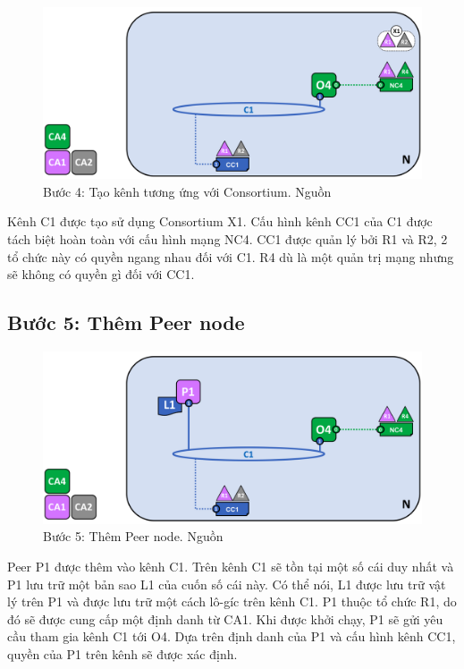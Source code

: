 \documentclass[../DoAn.tex]{subfiles}
\begin{document}
\begin{figure}[h]
  \centering
  \includegraphics[width=0.7\linewidth]{Hinhve/network.diagram.4.png}
  \caption[Bước 4: Tạo kênh tương ứng với Consortium]{Bước 4: Tạo kênh tương ứng với Consortium. Nguồn \cite{fabric_architecture}}
  \label{fig:fabric_step_4}
\end{figure}

Kênh C1 được tạo sử dụng Consortium X1. Cấu hình kênh CC1 của C1 được tách biệt
hoàn toàn với cấu hình mạng NC4. CC1 được quản lý bởi R1 và R2, 2 tổ chức này
có quyền ngang nhau đối với C1. R4 dù là một quản trị mạng nhưng sẽ không có
quyền gì đối với CC1.

\subsection{Bước 5: Thêm Peer node}

\begin{figure}[h]
  \centering
  \includegraphics[width=0.7\linewidth]{Hinhve/network.diagram.5.png}
  \caption[Bước 5: Thêm Peer node]{Bước 5: Thêm Peer node. Nguồn \cite{fabric_architecture}}
  \label{fig:fabric_step_5}
\end{figure}

Peer P1 được thêm vào kênh C1. Trên kênh C1 sẽ tồn tại một số cái duy nhất và
P1 lưu trữ một bản sao L1 của cuốn số cái này. Có thể nói, L1 được lưu trữ vật
lý trên P1 và được lưu trữ một cách lô-gíc trên kênh C1. P1 thuộc tổ chức R1,
do đó sẽ được cung cấp một định danh từ CA1. Khi được khởi chạy, P1 sẽ gửi yêu
cầu tham gia kênh C1 tới O4. Dựa trên định danh của P1 và cấu hình kênh CC1,
quyền của P1 trên kênh sẽ được xác định.
\end{document}
